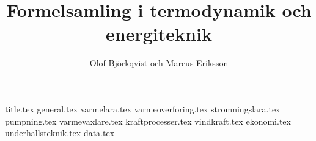 \documentclass[a4paper,11pt,onecolumn,fleqn]{report}
\author{Olof Björkqvist och Marcus Eriksson}
\title{Formelsamling i termodynamik och energiteknik}
\begin{document}
{title.tex}
\tableofcontents
\setlength\LTleft{0 cm}
{general.tex}
{varmelara.tex}
{varmeoverforing.tex}
{stromningslara.tex}
{pumpning.tex}
{varmevaxlare.tex}
{kraftprocesser.tex}
{vindkraft.tex}
{ekonomi.tex}
{underhallsteknik.tex}
{data.tex}
\cleardoublepage
\printglossary[title=Symboler, toctitle=Symboler, type=\acronymtype]
\cleardoublepage
{}
\printbibliography
\end{document}
